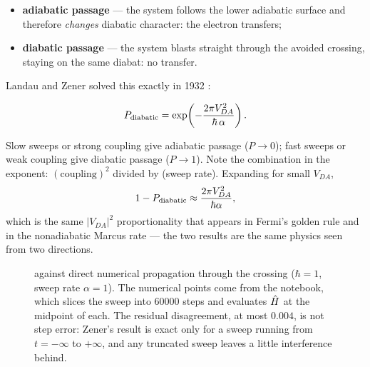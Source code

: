 \begin{itemize}[leftmargin=*,itemsep=2pt]
\item \textbf{adiabatic passage} --- the system follows the lower adiabatic surface and
therefore \emph{changes} diabatic character: the electron transfers;
\item \textbf{diabatic passage} --- the system blasts straight through the avoided
crossing, staying on the same diabat: no transfer.
\end{itemize}

\noindent
Landau and Zener solved this exactly in 1932 \cite{Zener1932,Landau1932}:

\begin{keyresult}
\vspace{-0.35cm}
\begin{equation}
P_{\rm diabatic} = \exp\!\left(-\frac{2\pi V_{DA}^2}{\hbar\,\alpha}\right).
\label{eq:lz}
\end{equation}
\end{keyresult}

\noindent
Slow sweeps or strong coupling give adiabatic passage ($P\to0$); fast sweeps or weak
coupling give diabatic passage ($P\to1$). Note the combination in the exponent:
$(\text{coupling})^2$ divided by (sweep rate). Expanding for small $V_{DA}$,
%
\begin{equation}
1 - P_{\rm diabatic} \approx \frac{2\pi V_{DA}^2}{\hbar\alpha},
\end{equation}
%
which is the same $|V_{DA}|^2$ proportionality that appears in Fermi's golden rule and
in the nonadiabatic Marcus rate --- the two results are the same physics seen from two
directions.

\begin{figure}[t]
\centering
{}
\caption{ against direct numerical propagation through the crossing
($\hbar=1$, sweep rate $\alpha=1$). The numerical points come from the notebook, which
slices the sweep into 60000 steps and evaluates $\hat{H}$ at the midpoint of each. The
residual disagreement, at most $0.004$, is not step error: Zener's result is exact only
for a sweep running from $t=-\infty$ to $+\infty$, and any truncated sweep leaves a
little interference behind.}
\label{fig:lz}
\end{figure}

